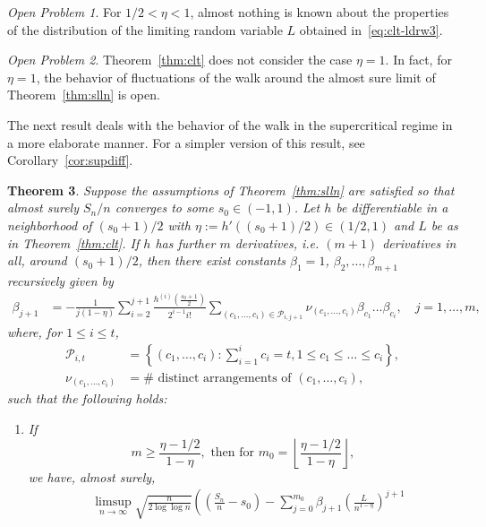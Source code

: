 \documentclass[12pt]{amsart}
\theoremstyle{plain}
\newtheorem{theorem}{Theorem}[section]
\theoremstyle{remark}
\newtheorem{problem}[theorem]{Open Problem}
\numberwithin{equation}{section}
\begin{document}
\begin{problem}\label{conj2}
    For $1/2 < \eta < 1$, almost nothing is known about the properties of the distribution of the limiting random variable $L$ obtained in~\eqref{eq:clt-ldrw3}.
\end{problem}
\begin{problem}\label{conj3}
    Theorem~\ref{thm:clt} does not consider the case $\eta = 1$. In fact, for $\eta = 1$, the behavior of fluctuations of the walk around the almost sure limit of Theorem~\ref{thm:slln} is open.
\end{problem}

The next result deals with the behavior of the walk in the supercritical regime in a more elaborate manner. For a simpler version of this result, see Corollary~\ref{cor:supdiff}.

{
\begin{theorem}\label{thm:super-dev1}
Suppose the assumptions of Theorem~\ref{thm:slln} are satisfied so that almost surely ${S_n}/{n}$ converges to some $s_0\in (-1,1)$. Let $h$ be differentiable in a neighborhood of $(s_0+1)/2$ 
with $\eta := h'((s_0+1)/2) \in  (1/2,1)$ and $L$ be as in Theorem~\ref{thm:clt}. 
If $h$ has further $m$ derivatives, i.e. $(m+1)$ derivatives in all, around $(s_0+1)/2$, then there exist constants $\beta_1 = 1$, $\beta_2, \ldots, \beta_{m+1}$ %
recursively given by \begin{align}\label{eq:beta_ldrw}\beta_{j+1} &= -\frac{1}{j(1-\eta)}\sum_{i=2}^{j+1}\frac{h^{(i)}\left(\frac{s_0+1}{2}\right)}{2^{i-1}i!}\sum_{(c_1, \ldots, c_i) \in \mathcal{P}_{i,j+1}}\nu_{(c_1, \ldots, c_i)}\beta_{c_1}\ldots \beta_{c_i}, \quad j = 1, \ldots, m,\end{align} 
where, for $1 \leq i \leq t$, 
\begin{align}\label{eq:combn}
\mathcal{P}_{i,t} &= \left\{(c_1, \ldots, c_i) : \sum_{i=1}^i c_i = t, 1 \leq c_1 \leq \ldots \leq c_i\right\}, \nonumber\\ 
\nu_{(c_1, \ldots, c_i)} &= \# \text{ distinct arrangements of } (c_1, \ldots, c_i),
\end{align}
such that the following holds:
\begin{enumerate}
\item[a)] If \[ m \geq \frac{\eta - 1/2}{1-\eta}, \text{ then for } m_0 = \left\lfloor\frac{\eta - 1/2}{1-\eta}\right\rfloor,\]
we have, almost surely,
\begin{align}\label{eq:slil-ldrw}
    &\limsup_{n\to\infty}\sqrt{\frac{n}{2\log \log n}}\left(\left(\frac{S_n}{n} - s_0\right) - \sum_{j = 0}^{m_0} \beta_{j+1}\left(\frac{L}{n^{1-\eta}}\right)^{j+1} 

\end{align}
\end{enumerate}
\end{theorem}}
\end{document}
